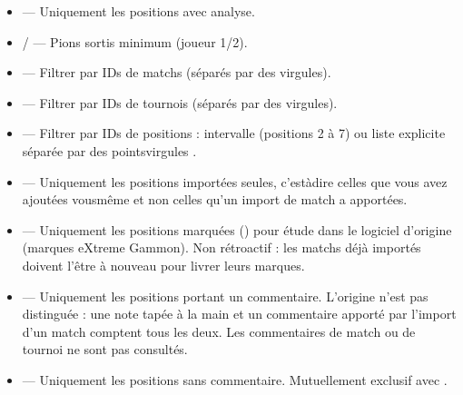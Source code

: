 \documentclass[letterpaper,10pt,french]{sphinxmanual}
\begin{document}
\begin{itemize}
\item {} 
\sphinxAtStartPar
{} — Uniquement les positions avec analyse.

\item {} 
\sphinxAtStartPar
{} /  — Pions sortis minimum (joueur 1/2).

\item {} 
\sphinxAtStartPar
{} — Filtrer par IDs de matchs (séparés par des virgules).

\item {} 
\sphinxAtStartPar
{} — Filtrer par IDs de tournois (séparés par des virgules).

\item {} 
\sphinxAtStartPar
{} — Filtrer par IDs de positions : intervalle 
(positions 2 à 7) ou liste explicite séparée par des points\sphinxhyphen{}virgules
.

\item {} 
\sphinxAtStartPar
{} — Uniquement les positions importées seules, c’est\sphinxhyphen{}à\sphinxhyphen{}dire
celles que vous avez ajoutées vous\sphinxhyphen{}même et non celles qu’un import de match
a apportées.

\item {} 
\sphinxAtStartPar
{} — Uniquement les positions marquées () pour étude dans
le logiciel d’origine (marques eXtreme Gammon). Non rétroactif : les
matchs déjà importés doivent l’être à nouveau pour livrer leurs marques.

\item {} 
\sphinxAtStartPar
{} — Uniquement les positions portant un commentaire.
L’origine n’est pas distinguée : une note tapée à la main et un commentaire
apporté par l’import d’un match comptent tous les deux. Les commentaires de
match ou de tournoi ne sont pas consultés.

\item {} 
\sphinxAtStartPar
{} — Uniquement les positions sans commentaire. Mutuellement
exclusif avec .

\end{itemize}
\end{document}

